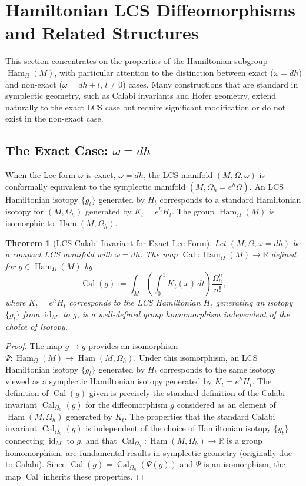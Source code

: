 \documentclass[11pt,a4paper]{amsart}
\newtheorem{theorem}{Theorem}[section]
\theoremstyle{definition}
\theoremstyle{remark}
\newcommand{\Ham}{\operatorname{Ham}}
\newcommand{\id}{\operatorname{id}}
\newcommand{\Cal}{\operatorname{Cal}}
\begin{document}
	\section{Hamiltonian LCS Diffeomorphisms and Related Structures}
	
	This section concentrates on the properties of the Hamiltonian subgroup $\Ham_\Omega(M)$, with particular attention to the distinction between exact ($\omega = dh$) and non-exact ($\omega = dh + l$, $l\neq 0$) cases. Many constructions that are standard in symplectic geometry, such as Calabi invariants and Hofer geometry, extend naturally to the exact LCS case but require significant modification or do not exist in the non-exact case.
	
	\subsection{The Exact Case: $\omega = dh$}
	
	When the Lee form $\omega$ is exact, $\omega = dh$, the LCS manifold $(M, \Omega, \omega)$ is conformally equivalent to the symplectic manifold $(M, \Omega_h = e^h\Omega)$. An LCS Hamiltonian isotopy $\{g_t\}$ generated by $H_t$ corresponds to a standard Hamiltonian isotopy for $(M, \Omega_h)$ generated by $K_t = e^h H_t$. The group $\Ham_\Omega(M)$ is isomorphic to $\Ham(M, \Omega_h)$.
	
	\begin{theorem}[LCS Calabi Invariant for Exact Lee Form] \label{thm:calabi_exact}
		Let $(M, \Omega, \omega = dh)$ be a compact LCS manifold with $\omega = dh$. The map $\Cal : \Ham_\Omega(M) \to \mathbb{R}$ defined for $g \in \Ham_\Omega(M)$ by
		\[
		\Cal(g) := \int_M \left( \int_0^1 K_t(x) \, dt \right) \frac{\Omega_h^n}{n!},
		\]
		where $K_t = e^h H_t$ corresponds to the LCS Hamiltonian $H_t$ generating an isotopy $\{g_t\}$ from $\id_M$ to $g$, is a well-defined group homomorphism independent of the choice of isotopy.
	\end{theorem}
	
	\begin{proof}
		The map $g \to g$ provides an isomorphism $\Psi : \Ham_\Omega(M) \to \Ham(M, \Omega_h)$. Under this isomorphism, an LCS Hamiltonian isotopy $\{g_t\}$ generated by $H_t$ corresponds to the same isotopy viewed as a symplectic Hamiltonian isotopy generated by $K_t = e^h H_t$. The definition of $\Cal(g)$ given is precisely the standard definition of the Calabi invariant $\Cal_{\Omega_h}(g)$ for the diffeomorphism $g$ considered as an element of $\Ham(M, \Omega_h)$ generated by $K_t$. The properties that the standard Calabi invariant $\Cal_{\Omega_h}(g)$ is independent of the choice of Hamiltonian isotopy $\{g_t\}$ connecting $\id_M$ to $g$, and that $\Cal_{\Omega_h} : \Ham(M, \Omega_h) \to \mathbb{R}$ is a group homomorphism, are fundamental results in symplectic geometry (originally due to Calabi). Since $\Cal(g) = \Cal_{\Omega_h}(\Psi(g))$ and $\Psi$ is an isomorphism, the map $\Cal$ inherits these properties.
	\end{proof}
	
\end{document}
